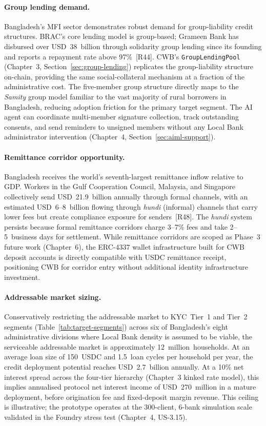 \paragraph{Group lending demand.}
Bangladesh's MFI sector demonstrates robust demand for group-liability credit
structures. BRAC's core lending model is group-based; Grameen Bank has
disbursed over USD~38~billion through solidarity group lending since its
founding and reports a repayment rate above 97\%~[R44]. CWB's
\texttt{GroupLendingPool} (Chapter~3, Section~\ref{sec:group-lending})
replicates the group-liability structure on-chain, providing the same
social-collateral mechanism at a fraction of the administrative cost.
The five-member group structure directly maps to the \emph{Samity} group model
familiar to the vast majority of rural borrowers in Bangladesh, reducing
adoption friction for the primary target segment. The AI agent can coordinate
multi-member signature collection, track outstanding consents, and send
reminders to unsigned members without any Local Bank administrator
intervention (Chapter~4, Section~\ref{sec:aiml-support}).

\paragraph{Remittance corridor opportunity.}
Bangladesh receives the world's seventh-largest remittance inflow relative to
GDP. Workers in the Gulf Cooperation Council, Malaysia, and Singapore
collectively send USD~21.9~billion annually through formal channels, with an
estimated USD~6--8~billion flowing through \emph{hundi} (informal) channels
that carry lower fees but create compliance exposure for senders~[R48]. The
\emph{hundi} system persists because formal remittance corridors charge
3--7\% fees and take 2--5~business days for settlement. While remittance
corridors are scoped as Phase~3 future work (Chapter~6), the ERC-4337
wallet infrastructure built for CWB deposit accounts is directly compatible
with USDC remittance receipt, positioning CWB for corridor entry without
additional identity infrastructure investment.

\paragraph{Addressable market sizing.}
Conservatively restricting the addressable market to KYC~Tier~1 and
Tier~2 segments (Table~\ref{tab:target-segments}) across six of Bangladesh's
eight administrative divisions where Local Bank density is assumed to be
viable, the serviceable addressable market is approximately
12~million~households. At an average loan size of 150~USDC and 1.5~loan
cycles per household per year, the credit deployment potential reaches
USD~2.7~billion annually. At a 10\% net interest spread across the four-tier
hierarchy (Chapter~3 kinked rate model), this implies annualised protocol
net interest income of USD~270~million in a mature deployment, before
origination fee and fixed-deposit margin revenue. This ceiling is
illustrative; the prototype operates at the 300-client, 6-bank simulation
scale validated in the Foundry stress test (Chapter~4, US-3.15).


